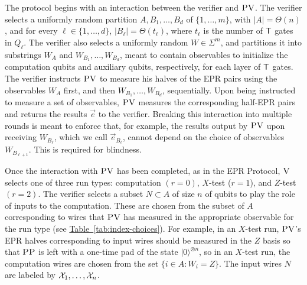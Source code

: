 \documentclass[11pt]{article}
\numberwithin{equation}{section}
\theoremstyle{definition}
\theoremstyle{plain}
\newcommand{\expref}[2]{\hyperref[#2]{#1~\ref{#2}}}
\newcommand{\ket}[1]{|#1\rangle}
\newcommand{\ver}{\textsc{V}}
\newcommand{\pv}{\textsc{PV}}
\newcommand{\pp}{\textsc{PP}}
\begin{document}
The protocol begins with an interaction between the verifier and $\pv$. The verifier selects a uniformly random partition $A,B_1,\dots,B_d$ of $\{1,\dots,m\}$, with $|A|=\Theta(n)$, and for every $\ell\in\{1,\dots,d\}$, $|B_{\ell}|=\Theta(t_\ell)$, where $t_{\ell}$ is the number of $\sf T$ gates in $Q_\ell$. The verifier also selects a uniformly random $W\in\Sigma^m$, and partitions it into substrings $W_A$ and $W_{B_1},\ldots,W_{B_d}$, meant to contain observables to initialize the computation qubits and auxiliary qubits,
respectively, %
 for each layer of ${\sf T}$ gates.
%
The verifier instructs $\pv$ to measure his halves of the EPR pairs using the observables $W_A$ first, and then $W_{B_1},\ldots,W_{B_d}$, sequentially. Upon being instructed to measure a set of observables, $\pv$ measures the corresponding half-EPR pairs and returns the results $\vec{e}$ to the verifier. Breaking this interaction into multiple rounds is meant to enforce that, for example, the results output by $\pv$ upon receiving $W_{B_{\ell}}$, which we call $\vec{e}_{B_{\ell}}$, cannot depend on the choice of observables $W_{B_{\ell+1}}$. This is required for blindness. 

Once the interaction with $\pv$ has been completed, as in the EPR Protocol, $\ver$ selects one of three run types: computation $(r=0)$, $X$-test ($r=1$), and $Z$-test $(r=2)$. 
The verifier selects a subset $N\subset A$ of size $n$ of qubits to play the role of inputs to the computation. These are chosen from the subset of $A$ corresponding to wires that $\pv$ has measured in the appropriate observable for the run type (see \expref{Table}{tab:index-choices}). For example, in an $X$-test run, $\pv$'s EPR halves corresponding to input wires should be measured in the $Z$ basis so that $\pp$ is left with a one-time pad of the state $\ket{0}^{\otimes n}$, so in an $X$-test run, the computation wires are chosen from the set $\{i\in A:W_i=Z\}$. The input wires $N$ are labeled by ${\cal X}_1,\dots,{\cal X}_n$. 
\end{document}
